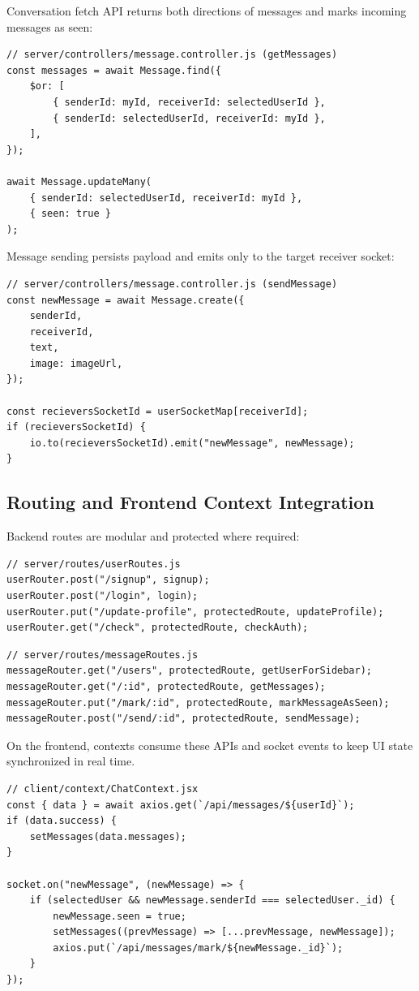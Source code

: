 \documentclass[12pt,a4paper]{report}
\begin{document}
Conversation fetch API returns both directions of messages and marks incoming messages as seen:

\begin{verbatim}
// server/controllers/message.controller.js (getMessages)
const messages = await Message.find({
    $or: [
        { senderId: myId, receiverId: selectedUserId },
        { senderId: selectedUserId, receiverId: myId },
    ],
});

await Message.updateMany(
    { senderId: selectedUserId, receiverId: myId },
    { seen: true }
);
\end{verbatim}

Message sending persists payload and emits only to the target receiver socket:

\begin{verbatim}
// server/controllers/message.controller.js (sendMessage)
const newMessage = await Message.create({
    senderId,
    receiverId,
    text,
    image: imageUrl,
});

const recieversSocketId = userSocketMap[receiverId];
if (recieversSocketId) {
    io.to(recieversSocketId).emit("newMessage", newMessage);
}
\end{verbatim}

\subsection{Routing and Frontend Context Integration}
Backend routes are modular and protected where required:

\begin{verbatim}
// server/routes/userRoutes.js
userRouter.post("/signup", signup);
userRouter.post("/login", login);
userRouter.put("/update-profile", protectedRoute, updateProfile);
userRouter.get("/check", protectedRoute, checkAuth);
\end{verbatim}

\begin{verbatim}
// server/routes/messageRoutes.js
messageRouter.get("/users", protectedRoute, getUserForSidebar);
messageRouter.get("/:id", protectedRoute, getMessages);
messageRouter.put("/mark/:id", protectedRoute, markMessageAsSeen);
messageRouter.post("/send/:id", protectedRoute, sendMessage);
\end{verbatim}

On the frontend, contexts consume these APIs and socket events to keep UI state synchronized in real time.

\begin{verbatim}
// client/context/ChatContext.jsx
const { data } = await axios.get(`/api/messages/${userId}`);
if (data.success) {
    setMessages(data.messages);
}

socket.on("newMessage", (newMessage) => {
    if (selectedUser && newMessage.senderId === selectedUser._id) {
        newMessage.seen = true;
        setMessages((prevMessage) => [...prevMessage, newMessage]);
        axios.put(`/api/messages/mark/${newMessage._id}`);
    }
});
\end{verbatim}
\end{document}
